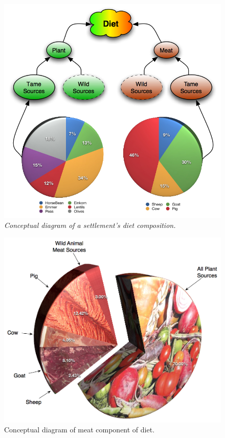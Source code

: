 \begin{figure}[htbp] %
  \includegraphics[scale=.32]{./images/dietDiagram.jpg}
  \caption{\label{fig:dietDiagram}\textit{Conceptual diagram of a settlement's
    diet composition.}}
\end{figure}

\begin{figure}[htbp] %
  \includegraphics[scale=.23]{./images/fancyDietMeat.jpg}
  \caption[Plant Portion of Diet]{\label{fig:dietMeatDiagram}Conceptual
    diagram of meat component of diet.}
\end{figure}

